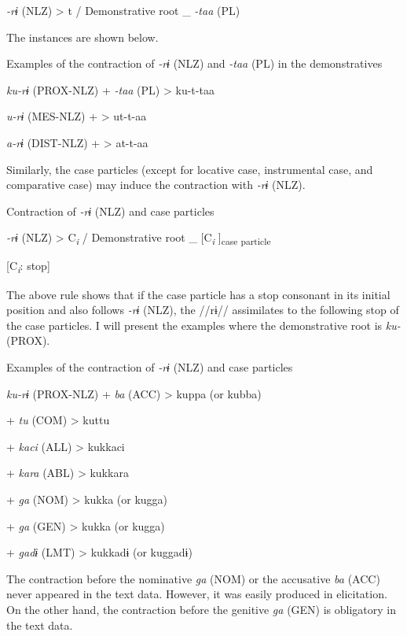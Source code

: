   \textit{{}-rɨ} (NLZ)  >  t  /  Demonstrative root  \_  \textit{{}-taa} (PL)
\z

The instances are shown below.

\ea \label{ex:5:19}   Examples of the contraction of \textit{{}-rɨ} (NLZ) and \textit{{}-taa} (PL) in the demonstratives

  \textit{ku-rɨ}  (PROX-NLZ)  +  \textit{{}-taa} (PL)  >  ku-t-taa

  \textit{u-rɨ}  (MES-NLZ)  +      >  ut-t-aa

  \textit{a-rɨ}  (DIST-NLZ)  +      >  at-t-aa
\z

Similarly, the case particles (except for locative case, instrumental case, and comparative case) may induce the contraction with \textit{{}-rɨ} (NLZ).

\ea \label{ex:5:20}   Contraction of \textit{{}-rɨ} (NLZ) and case particles

  \textit{{}-rɨ} (NLZ)  >  C\textit{\textsubscript{i}}  /  Demonstrative root  \_  [C\textit{\textsubscript{i}}      ]\textsubscript{case particle}

                [C\textit{\textsubscript{i}}: stop]
\z

The above rule shows that if the case particle has a stop consonant in its initial position and also follows \textit{{}-rɨ} (NLZ), the //rɨ// assimilates to the following stop of the case particles. I will present the examples where the demonstrative root is \textit{ku-} (PROX).

\ea \label{ex:5:21}   Examples of the contraction of \textit{{}-rɨ} (NLZ) and case particles

  \textit{ku-rɨ}  (PROX-NLZ)  +  \textit{ba}  (ACC)  >  kuppa  (or kubba)

      +  \textit{tu}  (COM)  >  kuttu  

      +  \textit{kaci}  (ALL)  >  kukkaci  

      +  \textit{kara}  (ABL)  >  kukkara  

      +  \textit{ga}  (NOM)  >  kukka  (or kugga)

      +  \textit{ga}  (GEN)  >  kukka  (or kugga)

      +  \textit{gadɨ}  (LMT)  >  kukkadɨ  (or kuggadɨ)
\z

The contraction before the nominative \textit{ga} (NOM) or the accusative \textit{ba} (ACC) never appeared in the text data. However, it was easily produced in elicitation. On the other hand, the contraction before the genitive \textit{ga} (GEN) is obligatory in the text data.

